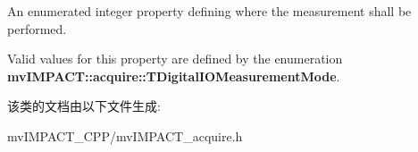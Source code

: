 An enumerated integer property defining where the measurement shall be performed. 

Valid values for this property are defined by the enumeration {\bfseries mv\+I\+M\+P\+A\+C\+T\+::acquire\+::\+T\+Digital\+I\+O\+Measurement\+Mode}. 

该类的文档由以下文件生成\+:\begin{DoxyCompactItemize}
\item 
mv\+I\+M\+P\+A\+C\+T\+\_\+\+C\+P\+P/mv\+I\+M\+P\+A\+C\+T\+\_\+acquire.\+h\end{DoxyCompactItemize}
